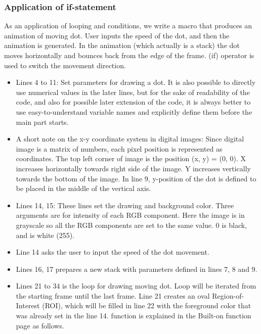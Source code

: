 
\subsubsection{Application of if-statement}
\label{sec:dotmove}

As an application of looping and conditions, we write a macro that produces an animation of moving dot. User inputs the speed of the dot, and then the animation is generated. 
In the animation (which actually is a stack) the dot moves horizontally and bounces back from the edge
of the frame. 
\ilcom(if) operator is used to switch the movement direction.


\begin{itemize}
\item Lines 4 to 11: Set parameters for drawing a dot. It is also possible to directly use numerical values in the later lines, but for the sake of readability of the code, and also for possible later extension of the code, it is always better to use easy-to-understand variable names and explicitly define them before the main part starts. 
\item A short note on the x-y coordinate system in digital images: Since digital image is a matrix of numbers, each pixel position is represented as coordinates. The top left corner of image is the position (x, y) = (0, 0). X increases horizontally towards right side of the image. Y increases vertically towards the bottom of the image.  In line 9, y-position of the dot is defined to be placed in the middle of the vertical axis. 
\item Lines 14, 15: These lines set the drawing and background color. Three arguments are for  intensity of each RGB component. Here the image is in grayscale so all the RGB components are set to the same value. 0 is black, and  is white (255).
\item Line 14 asks the user to input the speed of the dot movement.
\item Lines 16, 17 prepares a new stack with parameters defined in lines 7, 8 and 9.
\item Lines 21 to 34 is the loop for drawing moving dot. Loop will be iterated from the starting frame until the last frame. Line 21 creates an oval Region-of-Interest (ROI), which will be filled in line 22 with the foreground color that was already set in the line 14.  function is explained in the Built-on function page as follows.


\end{itemize}
